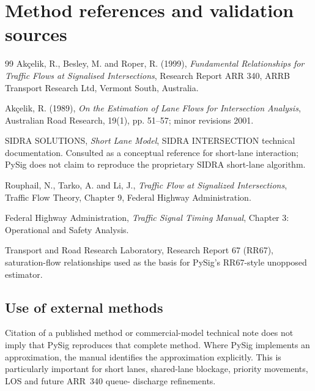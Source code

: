 \chapter{Method references and validation sources}
\label{app:references}

\begin{thebibliography}{99}
Ak\c{c}elik, R., Besley, M. and Roper, R. (1999),
\emph{Fundamental Relationships for Traffic Flows at Signalised Intersections},
Research Report ARR 340, ARRB Transport Research Ltd, Vermont South, Australia.

Ak\c{c}elik, R. (1989),
\emph{On the Estimation of Lane Flows for Intersection Analysis},
Australian Road Research, 19(1), pp. 51--57; minor revisions 2001.

SIDRA SOLUTIONS, \emph{Short Lane Model}, SIDRA INTERSECTION technical
documentation.  Consulted as a conceptual reference for short-lane interaction;
PySig does not claim to reproduce the proprietary SIDRA short-lane algorithm.

Rouphail, N., Tarko, A. and Li, J.,
\emph{Traffic Flow at Signalized Intersections}, Traffic Flow Theory, Chapter 9,
Federal Highway Administration.

Federal Highway Administration,
\emph{Traffic Signal Timing Manual}, Chapter 3: Operational and Safety Analysis.

Transport and Road Research Laboratory, Research Report 67 (RR67), saturation-flow
relationships used as the basis for PySig's RR67-style unopposed estimator.
\end{thebibliography}

\section{Use of external methods}
Citation of a published method or commercial-model technical note does not imply that
PySig reproduces that complete method.  Where PySig implements an approximation, the
manual identifies the approximation explicitly.  This is particularly important for
short lanes, shared-lane blockage, priority movements, LOS and future ARR~340 queue-
discharge refinements.
